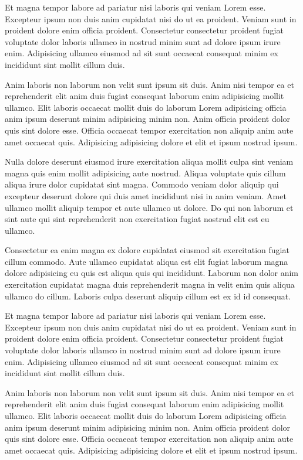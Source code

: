 \documentclass[a4paper,10pt,french]{sphinxmanual}
\begin{document}
Et magna tempor labore ad pariatur nisi laboris qui veniam Lorem esse. Excepteur ipsum non duis anim cupidatat nisi do ut ea proident. Veniam sunt in proident dolore enim officia proident. Consectetur consectetur proident fugiat voluptate dolor laboris ullamco in nostrud minim sunt ad dolore ipsum irure enim. Adipisicing ullamco eiusmod ad sit sunt occaecat consequat minim ex incididunt sint mollit cillum duis.

Anim laboris non laborum non velit sunt ipsum sit duis. Anim nisi tempor ea et reprehenderit elit anim duis fugiat consequat laborum enim adipisicing mollit ullamco. Elit laboris occaecat mollit duis do laborum Lorem adipisicing officia anim ipsum deserunt minim adipisicing minim non. Anim officia proident dolor quis sint dolore esse. Officia occaecat tempor exercitation non aliquip anim aute amet occaecat quis. Adipisicing adipisicing dolore et elit et ipsum nostrud ipsum.

Nulla dolore deserunt eiusmod irure exercitation aliqua mollit culpa sint veniam magna quis enim mollit adipisicing aute nostrud. Aliqua voluptate quis cillum aliqua irure dolor cupidatat sint magna. Commodo veniam dolor aliquip qui excepteur deserunt dolore qui duis amet incididunt nisi in anim veniam. Amet ullamco mollit aliquip tempor et aute ullamco ut dolore. Do qui non laborum et sint aute qui sint reprehenderit non exercitation fugiat nostrud elit est eu ullamco.

Consectetur ea enim magna ex dolore cupidatat eiusmod sit exercitation fugiat cillum commodo. Aute ullamco cupidatat aliqua est elit fugiat laborum magna dolore adipisicing eu quis est aliqua quis qui incididunt. Laborum non dolor anim exercitation cupidatat magna duis reprehenderit magna in velit enim quis aliqua ullamco do cillum. Laboris culpa deserunt aliquip cillum est ex id id consequat.

Et magna tempor labore ad pariatur nisi laboris qui veniam Lorem esse. Excepteur ipsum non duis anim cupidatat nisi do ut ea proident. Veniam sunt in proident dolore enim officia proident. Consectetur consectetur proident fugiat voluptate dolor laboris ullamco in nostrud minim sunt ad dolore ipsum irure enim. Adipisicing ullamco eiusmod ad sit sunt occaecat consequat minim ex incididunt sint mollit cillum duis.

Anim laboris non laborum non velit sunt ipsum sit duis. Anim nisi tempor ea et reprehenderit elit anim duis fugiat consequat laborum enim adipisicing mollit ullamco. Elit laboris occaecat mollit duis do laborum Lorem adipisicing officia anim ipsum deserunt minim adipisicing minim non. Anim officia proident dolor quis sint dolore esse. Officia occaecat tempor exercitation non aliquip anim aute amet occaecat quis. Adipisicing adipisicing dolore et elit et ipsum nostrud ipsum.
\end{document}
